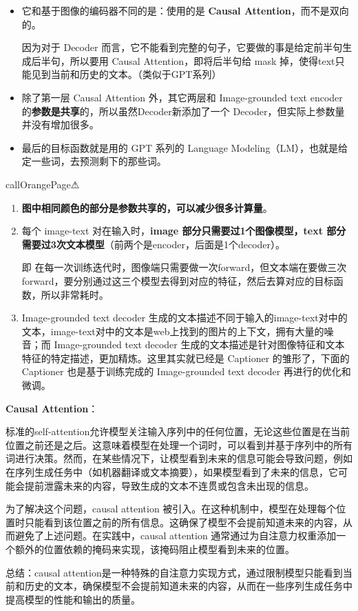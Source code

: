 \documentclass[zihao=false,fontset=windows]{ctexart}
\begin{document}
\begin{itemize}
\begin{itemize}
\item 它和基于图像的编码器不同的是：使用的是\textbf{ Causal Attention}，而不是双向的。\par
因为对于 Decoder 而言，它不能看到完整的句子，它要做的事是给定前半句生成后半句，所以要用 Causal Attention，即将后半句给 mask 掉，使得text只能见到当前和历史的文本。（类似于GPT系列）
\item 除了第一层 Causal Attention 外，其它两层和 Image-grounded text encoder 的\textbf{参数是共享}的，所以虽然Decoder新添加了一个 Decoder，但实际上参数量并没有增加很多。
\item 最后的目标函数就是用的 GPT 系列的 Language Modeling（LM），也就是给定一些词，去预测剩下的那些词。
\end{itemize}
\end{itemize}

\begin{feishubox}{callOrangePage}{⚠}
\begin{enumerate}
\item \textbf{图中相同颜色的部分是参数共享的，可以减少很多计算量}。
\item 每个 image-text 对在输入时，\textbf{image 部分只需要过1个图像模型，text 部分需要过3次文本模型}（前两个是encoder，后面是1个decoder）。\par
即 在每一次训练迭代时，图像端只需要做一次forward，但文本端在要做三次forward，要分别通过这三个模型去得到对应的特征，然后去算对应的目标函数，所以\textcolor{feishuBlue}{非常耗时}。
\item Image-grounded text decoder 生成的文本描述不同于输入的image-text对中的文本，image-text对中的文本是web上找到的图片的上下文，拥有大量的噪音；而 Image-grounded text decoder 生成的文本描述是针对图像特征和文本特征的特定描述，更加精炼。这里其实就已经是 Captioner 的雏形了，下面的 Captioner 也是基于训练完成的 Image-grounded text decoder 再进行的优化和微调。
\end{enumerate}
\end{feishubox}

\begin{feishuquote}
\textbf{Causal Attention}：\par
标准的self-attention允许模型关注输入序列中的任何位置，无论这些位置是在当前位置之前还是之后。这意味着模型在处理一个词时，可以看到并基于序列中的所有词进行决策。然而，在某些情况下，让模型看到未来的信息可能会导致问题，例如在序列生成任务中（如机器翻译或文本摘要），如果模型看到了未来的信息，它可能会提前泄露未来的内容，导致生成的文本不连贯或包含未出现的信息。\par
为了解决这个问题，causal attention 被引入。在这种机制中，模型在处理每个位置时只能看到该位置之前的所有信息。这确保了模型不会提前知道未来的内容，从而避免了上述问题。在实践中，causal attention 通常通过为自注意力权重添加一个额外的位置依赖的掩码来实现，该掩码阻止模型看到未来的位置。\par
总结：causal attention是一种特殊的自注意力实现方式，通过限制模型只能看到当前和历史的文本，确保模型不会提前知道未来的内容，从而在一些序列生成任务中提高模型的性能和输出的质量。\par
\end{feishuquote}
\end{document}

